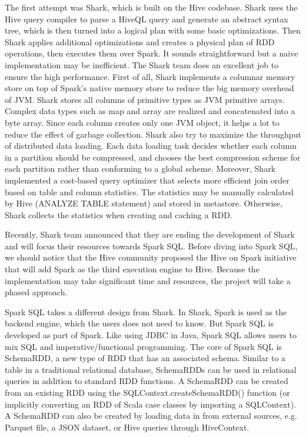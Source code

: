 \documentclass[11pt]{book}
\begin{document}
The first attempt was Shark, which is built on the Hive codebase. Shark uses the Hive query compiler to parse a HiveQL query and generate an abstract syntax tree, which is then turned into a logical plan with some basic optimizations. Then Shark applies additional optimizations and creates a physical plan of RDD operations, then executes them over Spark. It sounds straightforward but a naive implementation may be inefficient. The Shark team does an excellent job to ensure the high performance. First of all, Shark implements a columnar memory store on top of Spark's native memory store to reduce the big memory overhead of JVM. Shark stores all columns of primitive types as JVM primitive arrays. Complex data types such as map and array are realized and concatenated into a byte array. Since each column creates only one JVM object, it helps a lot to reduce the effect of garbage collection. Shark also try to maximize the throughput of distributed data loading. Each data loading task decides whether each column in a partition should be compressed, and chooses the best compression scheme for each partition rather than conforming to a global scheme. Moreover, Shark implemented a cost-based query optimizer that selects more efficient join order based on table and column statistics. The statistics may be manually calculated by Hive (ANALYZE TABLE statement) and stored in metastore. Otherwise, Shark collects the statistics when creating and caching a RDD.

Recently, Shark team announced that they are ending the development of Shark and will focus their resources towards Spark SQL. Before diving into Spark SQL, we should notice that the Hive community proposed the Hive on Spark initiative that will add Spark as the third execution engine to Hive. Because the implementation may take significant time and resources, the project will take a phased approach.

Spark SQL takes a different design from Shark. In Shark, Spark is used as the backend engine, which the users does not need to know. But Spark SQL is developed as part of Spark. Like using JDBC in Java, Spark SQL allows users to mix SQL and imperative/functional programming. The core of Spark SQL is SchemaRDD, a new type of RDD that has an associated schema. Similar to a table in a traditional relational database, SchemaRDDs can be used in relational queries in addition to standard RDD functions. A SchemaRDD can be created from an existing RDD using the SQLContext.createSchemaRDD() function (or implicitly converting an RDD of Scala case classes by importing a SQLContext). A SchemaRDD can also be created by loading data in from external sources, e.g. Parquet file, a JSON dataset, or Hive queries through HiveContext.
\end{document}
